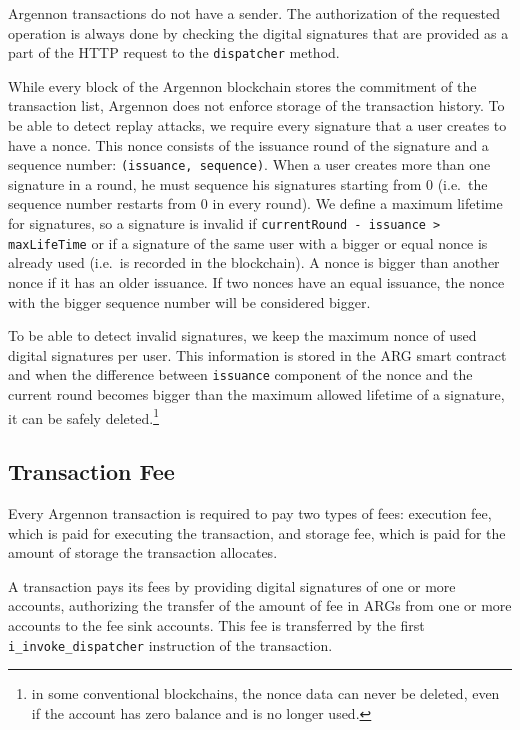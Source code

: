 Argennon transactions do not have a sender. The authorization of the requested operation is always done by checking the
digital signatures that are provided as a part of the HTTP request to the \texttt{dispatcher} method.

While every block of the Argennon blockchain stores the commitment of the transaction list, Argennon does not enforce
storage of the transaction history. To be able to detect replay attacks, we require
every signature that a user creates to have a nonce. This nonce consists of the issuance round of the signature
and a sequence number: \texttt{(issuance,\ sequence)}. When a user creates more than one signature in a round, he
must sequence his signatures starting from 0 (i.e.~the sequence number restarts from 0 in every round). We define
a maximum lifetime for signatures, so a signature is invalid if \texttt{currentRound - issuance > maxLifeTime} or
if a signature of the same user with a bigger or equal nonce is already used
(i.e.~is recorded in the blockchain). A nonce is bigger than another nonce if it has an older issuance. If two
nonces have an equal issuance, the nonce with the bigger sequence number will be considered bigger.

To be able to detect invalid signatures, we keep the maximum nonce of used digital signatures per user. This information
is stored in the ARG smart contract and when the difference between \texttt{issuance} component of the nonce and
the current round becomes bigger than the maximum allowed lifetime of a signature, it can be safely
deleted.\footnote{in some conventional
blockchains, the nonce data can never be deleted, even if the account has zero balance and is no longer used.}

\subsection{Transaction Fee}\label{subsec:fee}

Every Argennon transaction is required to pay two types of fees: execution fee, which is paid for executing the
transaction, and storage fee, which is paid for the amount of storage the transaction allocates.

A transaction pays
its fees by providing digital signatures of one or more accounts, authorizing the transfer of the amount of fee in
ARGs from one or more accounts to the fee sink accounts. This fee is transferred by the first
\texttt{i\_invoke\_dispatcher} instruction of the transaction.


